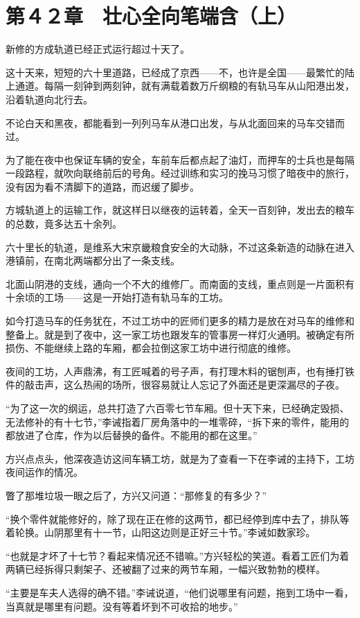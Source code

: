 \section{第４２章　壮心全向笔端含（上）}

新修的方成轨道已经正式运行超过十天了。

这十天来，短短的六十里道路，已经成了京西——不，也许是全国——最繁忙的陆上通道。每隔一刻钟到两刻钟，就有满载着数万斤纲粮的有轨马车从山阳港出发，沿着轨道向北行去。

不论白天和黑夜，都能看到一列列马车从港口出发，与从北面回来的马车交错而过。

为了能在夜中也保证车辆的安全，车前车后都点起了油灯，而押车的士兵也是每隔一段路程，就吹向联络前后的号角。经过训练和实习的挽马习惯了暗夜中的旅行，没有因为看不清脚下的道路，而迟缓了脚步。

方城轨道上的运输工作，就这样日以继夜的运转着，全天一百刻钟，发出去的粮车的总数，竟多达五十余列。

六十里长的轨道，是维系大宋京畿粮食安全的大动脉，不过这条新造的动脉在进入港镇前，在南北两端都分出了一条支线。

北面山阴港的支线，通向一个不大的维修厂。而南面的支线，重点则是一片面积有十余顷的工场——这是一开始打造有轨马车的工坊。

如今打造马车的任务犹在，不过工坊中的匠师们更多的精力是放在对马车的维修和整备上。就是到了夜中，这一家工坊也跟发车的管事房一样灯火通明。被确定有所损伤、不能继续上路的车厢，都会拉倒这家工坊中进行彻底的维修。

夜间的工坊，人声鼎沸，有工匠喊着的号子声，有打理木料的锯刨声，也有捶打铁件的敲击声，这么热闹的场所，很容易就让人忘记了外面还是更深漏尽的子夜。

“为了这一次的纲运，总共打造了六百零七节车厢。但十天下来，已经确定毁损、无法修补的有十七节，”李诫指着厂房角落中的一堆零碎，“拆下来的零件，能用的都放进了仓库，作为以后替换的备件。不能用的都在这里。”

方兴点点头，他深夜造访这间车辆工坊，就是为了查看一下在李诫的主持下，工坊夜间运作的情况。

瞥了那堆垃圾一眼之后了，方兴又问道：“那修复的有多少？”

“换个零件就能修好的，除了现在正在修的这两节，都已经停到库中去了，排队等着轮换。山阴那里有十一节，山阳这边则是正好三十节。”李诫如数家珍。

“也就是才坏了十七节？看起来情况还不错嘛。”方兴轻松的笑道。看着工匠们为着两辆已经拆得只剩架子、还被翻了过来的两节车厢，一幅兴致勃勃的模样。

“主要是车夫人选得的确不错。”李诫说道，“他们说哪里有问题，拖到工场中一看，当真就是哪里有问题。没有等着坏到不可收拾的地步。”

